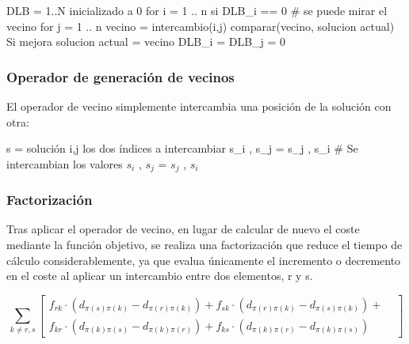 \documentclass[twoside]{article}
\begin{document}
\begin{pythoncode}
        DLB = 1..N inicializado a 0
        for i = 1 .. n
            si DLB_i == 0 # se puede mirar el vecino
                for j = 1 .. n
                    vecino = intercambio(i,j)
                    comparar(vecino, solucion actual)
                    Si mejora
                        solucion actual = vecino
                        DLB_i = DLB_j = 0
\end{pythoncode}

\subsubsection{Operador de generación de vecinos}

El operador de vecino simplemente intercambia una posición de la solución
con otra:

\begin{pythoncode}
s = solución
i,j los dos índices a intercambiar
s_i , s_j = s_j , s_i # Se intercambian los valores $s_i$ , $s_j$ = $s_j$ , $s_i$
\end{pythoncode}

\subsubsection{Factorización}

Tras aplicar el operador de vecino, en lugar de calcular de nuevo el coste mediante
la función objetivo, se realiza una factorización que reduce el tiempo de
cálculo considerablemente, ya que evalua únicamente el incremento o decremento
en el coste al aplicar un intercambio entre dos elementos, r y s.

\begin{displaymath}
    \sum_{k \neq r,s}
\begin{bmatrix}
 f_{rk}\cdot (d_{\pi (s)\pi(k)} -  d_{\pi (r)\pi(k)})
+ f_{sk}\cdot (d_{\pi (r)\pi(k)} -  d_{\pi (s)\pi(k)}) +  & \\
f_{kr}\cdot (d_{\pi (k)\pi(s)} -  d_{\pi (k)\pi(r)})  +
f_{ks}\cdot (d_{\pi (k)\pi(r)} -  d_{\pi (k)\pi(s)})  &
\end{bmatrix}
\end{displaymath}


\end{document}
